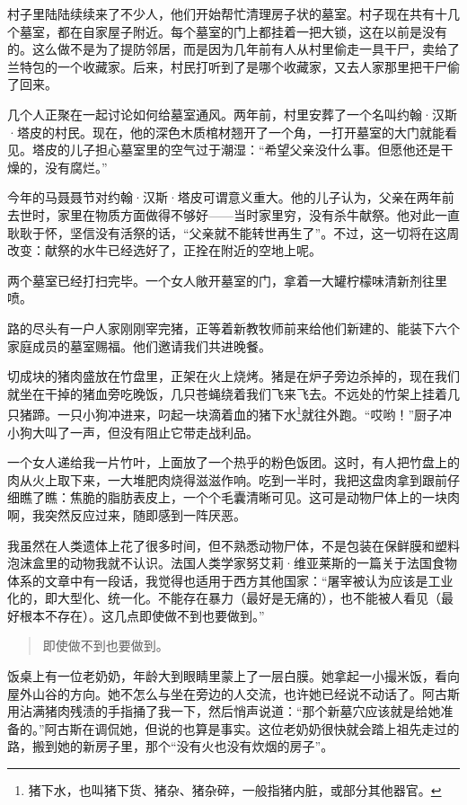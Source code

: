\documentclass[12pt,oneside]{book}
\begin{document}
村子里陆陆续续来了不少人，他们开始帮忙清理房子状的墓室。村子现在共有十几个墓室，都在自家屋子附近。每个墓室的门上都挂着一把大锁，这在以前是没有的。这么做不是为了提防邻居，而是因为几年前有人从村里偷走一具干尸，卖给了兰特包的一个收藏家。后来，村民打听到了是哪个收藏家，又去人家那里把干尸偷了回来。

几个人正聚在一起讨论如何给墓室通风。两年前，村里安葬了一个名叫约翰·汉斯·塔皮的村民。现在，他的深色木质棺材翘开了一个角，一打开墓室的大门就能看见。塔皮的儿子担心墓室里的空气过于潮湿：“希望父亲没什么事。但愿他还是干燥的，没有腐烂。”

今年的马聂聂节对约翰·汉斯·塔皮可谓意义重大。他的儿子认为，父亲在两年前去世时，家里在物质方面做得不够好——当时家里穷，没有杀牛献祭。他对此一直耿耿于怀，坚信没有活祭的话，“父亲就不能转世再生了”。不过，这一切将在这周改变：献祭的水牛已经选好了，正拴在附近的空地上呢。

两个墓室已经打扫完毕。一个女人敞开墓室的门，拿着一大罐柠檬味清新剂往里喷。

路的尽头有一户人家刚刚宰完猪，正等着新教牧师前来给他们新建的、能装下六个家庭成员的墓室赐福。他们邀请我们共进晚餐。

切成块的猪肉盛放在竹盘里，正架在火上烧烤。猪是在炉子旁边杀掉的，现在我们就坐在干掉的猪血旁吃晚饭，几只苍蝇绕着我们飞来飞去。不远处的竹架上挂着几只猪蹄。一只小狗冲进来，叼起一块滴着血的猪下水\footnote{猪下水，也叫猪下货、猪杂、猪杂碎，一般指猪内脏，或部分其他器官。}就往外跑。“哎哟！”厨子冲小狗大叫了一声，但没有阻止它带走战利品。

一个女人递给我一片竹叶，上面放了一个热乎的粉色饭团。这时，有人把竹盘上的肉从火上取下来，一大堆肥肉烧得滋滋作响。吃到一半时，我把这盘肉拿到跟前仔细瞧了瞧：焦脆的脂肪表皮上，一个个毛囊清晰可见。这可是动物尸体上的一块肉啊，我突然反应过来，随即感到一阵厌恶。

我虽然在人类遗体上花了很多时间，但不熟悉动物尸体，不是包装在保鲜膜和塑料泡沫盒里的动物我就不认识。法国人类学家努艾莉·维亚莱斯的一篇关于法国食物体系的文章中有一段话，我觉得也适用于西方其他国家：“屠宰被认为应该是工业化的，即大型化、统一化。不能存在暴力（最好是无痛的），也不能被人看见（最好根本不存在）。这几点即使做不到也要做到。”

\begin{quote}
即使做不到也要做到。
\end{quote}

饭桌上有一位老奶奶，年龄大到眼睛里蒙上了一层白膜。她拿起一小撮米饭，看向屋外山谷的方向。她不怎么与坐在旁边的人交流，也许她已经说不动话了。阿古斯用沾满猪肉残渍的手指捅了我一下，然后悄声说道：“那个新墓穴应该就是给她准备的。”阿古斯在调侃她，但说的也算是事实。这位老奶奶很快就会踏上祖先走过的路，搬到她的新房子里，那个“没有火也没有炊烟的房子”。
\end{document}

